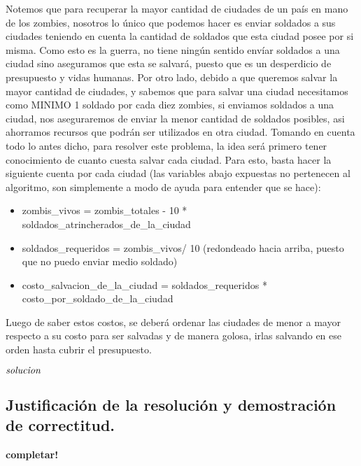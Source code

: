 Notemos que para recuperar la mayor cantidad de ciudades de un país en mano de los zombies, nosotros lo único que podemos hacer es enviar soldados a sus ciudades teniendo en cuenta la cantidad de soldados que esta ciudad posee por si misma. Como esto es la guerra, no tiene ningún sentido envíar soldados a una ciudad sino aseguramos que esta se salvará, puesto que es un desperdicio de presupuesto y vidas humanas. Por otro lado, debido a que queremos salvar la mayor cantidad de ciudades, y sabemos que para salvar una ciudad necesitamos como MINIMO 1 soldado por cada diez zombies, si enviamos soldados a una ciudad, nos aseguraremos de enviar la menor cantidad de soldados posibles, asi ahorramos recursos que podrán ser utilizados en otra ciudad. Tomando en cuenta todo lo antes dicho, para resolver este problema, la idea será primero tener conocimiento de cuanto cuesta salvar cada ciudad. Para esto, basta hacer la siguiente cuenta por cada ciudad (las variables abajo expuestas no pertenecen al algoritmo, son simplemente a modo de ayuda para entender que se hace):
\begin{itemize}
   \item  zombis_vivos = zombis_totales - 10 * soldados_atrincherados_de_la_ciudad
   \item  soldados_requeridos = zombis_vivos/ 10 (redondeado hacia arriba, puesto que no puedo enviar medio soldado)
   \item costo_salvacion_de_la_ciudad = soldados_requeridos * costo_por_soldado_de_la_ciudad  
\end{itemize}

Luego de saber estos costos, se deberá ordenar las ciudades de menor a mayor respecto a su costo para ser salvadas y de manera golosa, irlas salvando en ese orden hasta cubrir el presupuesto.

\begin{codebox}
\li \Return $\id{solucion}$
\end{codebox}



\newpage
\subsection{Justificación de la resolución y demostración de correctitud.}

\vspace*{0.3cm}

\textbf{completar!}




